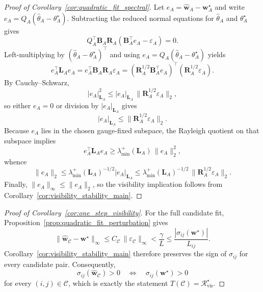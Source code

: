 \documentclass[preprint,12pt]{elsarticle}
\newcommand{\realpairs}{\mathcal{R}}
\newcommand{\candpairs}{\mathcal{C}}
\newcommand{\weights}{\mathbf{w}}
\newcommand{\inc}{\mathbf{B}}
\newcommand{\lap}{\mathbf{L}}
\begin{document}
\begin{proof}[Proof of Corollary~\ref{cor:quadratic_fit_spectral}]
Let $e_A=\widehat{\weights}_A-\weights_A^\star$ and write
$e_A=Q_A(\widehat{\theta}_A-\theta_A^\star)$. Subtracting the reduced normal
equations for $\widehat{\theta}_A$ and $\theta_A^\star$ gives
\begin{equation}
    Q_A^\top \inc_A\mathbf{R}_A(\inc_A^\top e_A-\varepsilon_A)=0.
\end{equation}
Left-multiplying by $(\widehat{\theta}_A-\theta_A^\star)^\top$ and using
$e_A=Q_A(\widehat{\theta}_A-\theta_A^\star)$ yields
\begin{equation}
    e_A^\top \lap_A e_A
    = e_A^\top \inc_A\mathbf{R}_A\varepsilon_A
    = (\mathbf{R}_A^{1/2}\inc_A^\top e_A)^\top(\mathbf{R}_A^{1/2}\varepsilon_A).
\end{equation}
By Cauchy--Schwarz,
\begin{equation}
    |e_A|_{\lap_A}^2
    \le |e_A|_{\lap_A}\,\lVert \mathbf{R}_A^{1/2}\varepsilon_A\rVert_2,
\end{equation}
so either $e_A=0$ or division by $|e_A|_{\lap_A}$ gives
\begin{equation}
    |e_A|_{\lap_A}
    \le \lVert \mathbf{R}_A^{1/2}\varepsilon_A\rVert_2.
\end{equation}
Because $e_A$ lies in the chosen gauge-fixed subspace, the Rayleigh quotient on
that subspace implies
\begin{equation}
    e_A^\top \lap_A e_A
    \ge \lambda_{\min}^+(\lap_A)\,\lVert e_A\rVert_2^2,
\end{equation}
whence
\begin{equation}
    \lVert e_A\rVert_2
    \le \lambda_{\min}^+(\lap_A)^{-1/2}|e_A|_{\lap_A}
    \le \lambda_{\min}^+(\lap_A)^{-1/2}\,\lVert \mathbf{R}_A^{1/2}\varepsilon_A\rVert_2.
\end{equation}
Finally, $\lVert e_A\rVert_\infty\le \lVert e_A\rVert_2$, so the visibility
implication follows from Corollary~\ref{cor:visibility_stability_main}.
\end{proof}

\begin{proof}[Proof of Corollary~\ref{cor:one_step_visibility}]
For the full candidate fit, Proposition~\ref{prop:quadratic_fit_perturbation}
gives
\begin{equation}
    \|\widehat{\weights}_{\candpairs}-\weights^\star\|_\infty
    \le C_{\candpairs}\,\|\varepsilon_{\candpairs}\|_\infty
    < \frac{\gamma}{L}
    \le \frac{|\sigma_{ij}(\weights^\star)|}{L_{ij}}.
\end{equation}
Corollary~\ref{cor:visibility_stability_main} therefore preserves the sign of
$\sigma_{ij}$ for every candidate pair. Consequently,
\begin{equation}
    \sigma_{ij}(\widehat{\weights}_{\candpairs})>0
    \quad\Longleftrightarrow\quad
    \sigma_{ij}(\weights^\star)>0
\end{equation}
for every $(i,j)\in\candpairs$, which is exactly the statement
$T(\candpairs)=\realpairs^\star_{\mathrm{vis}}$.
\end{proof}
\end{document}
